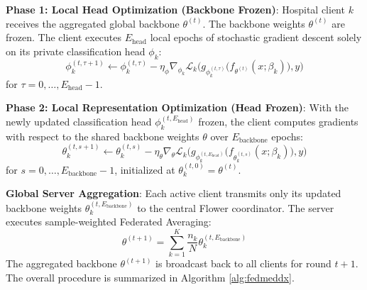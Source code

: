 \documentclass[conference]{IEEEtran}
\begin{document}
\textbf{Phase 1: Local Head Optimization (Backbone Frozen)}:
Hospital client $k$ receives the aggregated global backbone $\theta^{(t)}$. The backbone weights $\theta^{(t)}$ are frozen. The client executes $E_{\text{head}}$ local epochs of stochastic gradient descent solely on its private classification head $\phi_k$:
\begin{equation}
    \phi_k^{(t, \tau+1)} \leftarrow \phi_k^{(t, \tau)} - \eta_\phi \nabla_{\phi_k} \mathcal{L}_k\Big(g_{\phi_k^{(t, \tau)}}\big(f_{\theta^{(t)}}(x; \beta_k)\big), y\Big)
\end{equation}
for $\tau = 0, \dots, E_{\text{head}} - 1$.

\textbf{Phase 2: Local Representation Optimization (Head Frozen)}:
With the newly updated classification head $\phi_k^{(t, E_{\text{head}})}$ frozen, the client computes gradients with respect to the shared backbone weights $\theta$ over $E_{\text{backbone}}$ epochs:
\begin{equation}
    \theta_k^{(t, s+1)} \leftarrow \theta_k^{(t, s)} - \eta_\theta \nabla_\theta \mathcal{L}_k\Big(g_{\phi_k^{(t, E_{\text{head}})}}\big(f_{\theta_k^{(t, s)}}(x; \beta_k)\big), y\Big)
\end{equation}
for $s = 0, \dots, E_{\text{backbone}} - 1$, initialized at $\theta_k^{(t, 0)} = \theta^{(t)}$.

\textbf{Global Server Aggregation}:
Each active client transmits only its updated backbone weights $\theta_k^{(t, E_{\text{backbone}})}$ to the central Flower coordinator. The server executes sample-weighted Federated Averaging:
\begin{equation}
    \theta^{(t+1)} = \sum_{k=1}^K \frac{n_k}{N} \theta_k^{(t, E_{\text{backbone}})}
\end{equation}
The aggregated backbone $\theta^{(t+1)}$ is broadcast back to all clients for round $t+1$. The overall procedure is summarized in Algorithm \ref{alg:fedmeddx}.
\end{document}
